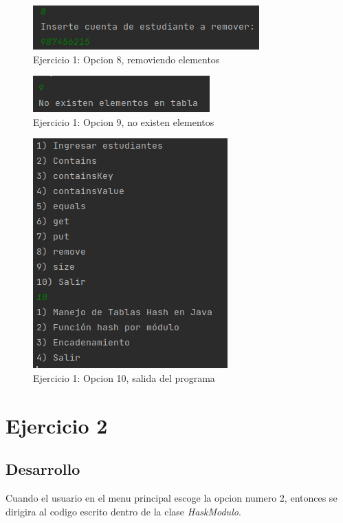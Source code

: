 \documentclass{article}
\begin{document}
			\begin{figure}[H]
				\centering
				\includegraphics{images/e120.png}
				\caption*{Ejercicio 1: Opcion 8, removiendo elementos}
			\end{figure}
			
			\begin{figure}[H]
				\centering
				\includegraphics{images/e121.png}
				\caption*{Ejercicio 1: Opcion 9, no existen elementos}
			\end{figure}
		
			
			\begin{figure}[H]
				\centering
				\includegraphics{images/e123.png}
				\caption*{Ejercicio 1: Opcion 10, salida del programa}
			\end{figure}
			
			\newpage

	\section{Ejercicio 2}
	
		\subsection{Desarrollo}
		
			Cuando el usuario en el menu principal escoge la opcion numero 2, entonces se dirigira al codigo escrito dentro de la clase \emph{HaskModulo}.\\
			
\end{document}
